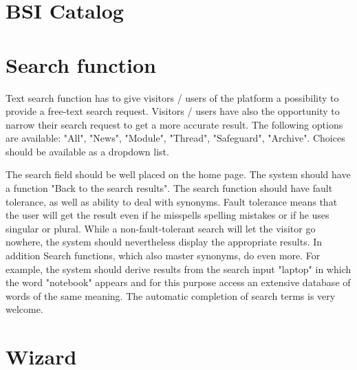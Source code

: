 \section{BSI Catalog}


\section{Search function}
\label{search_function}

Text search function has to give visitors / users of the platform a possibility to provide a free-text search request. 
Visitors / users have also the opportunity to narrow their search request to get a more accurate result. 
The following options are available: "All", "News", "Module", "Thread", "Safeguard", "Archive". Choices should be available as a dropdown list.

The search field should be well placed on the home page. 
The system should have a function "Back to the search results". 
The search function should have fault tolerance, as well as ability to deal with synonyms. 
Fault tolerance means that the user will get the result even if he misspells spelling mistakes or if he uses singular or plural. 
While a non-fault-tolerant search will let the visitor go nowhere, the system should nevertheless display the appropriate results.
In addition Search functions, which also master synonyms, do even more. 
For example, the system should derive results from the search input "laptop" in which the word "notebook" appears and for this purpose access an extensive database of words of the same meaning. 
The automatic completion of search terms is very welcome.


\section{Wizard}
\label{wizard}

